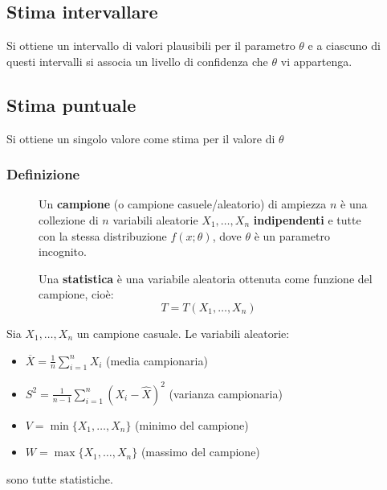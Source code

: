 \documentclass[a4paper]{article}
\theoremstyle{break}
\theoremstyle{break}
\theoremstyle{break}
\theoremstyle{break}
\begin{document}
\subsection{Stima intervallare}
Si ottiene un intervallo di valori plausibili per il parametro \( \theta \) e a
ciascuno di questi intervalli si associa un livello di confidenza che \( \theta \) vi
appartenga.

\subsection{Stima puntuale}
Si ottiene un singolo valore come stima per il valore di \( \theta \)

\subsubsection{Definizione}
\begin{figure}[H]
  \begin{definition}
    Un \textbf{campione} (o campione casuele/aleatorio) di ampiezza \( n \) è una
    collezione di \( n \) variabili aleatorie \( X_1, \ldots, X_n \) \textbf{indipendenti}
    e tutte con la stessa distribuzione \( f(x; \theta) \), dove \( \theta \) è un
    parametro incognito.
    
    \vspace{1em}
    \noindent Una \textbf{statistica} è una variabile aleatoria ottenuta come funzione
    del campione, cioè:
    \[
    T = T(X_1, \ldots, X_n)
    \] 
  \end{definition}
\end{figure}

\begin{example}
  Sia \( X_1, \ldots, X_n \) un campione casuale. Le variabili aleatorie:
  \begin{itemize}
    \item \( \overline{X} = \frac{1}{n} \sum_{i=1}^n X_i \) (media campionaria)

    \item \( S^2 = \frac{1}{n-1} \sum_{i=1}^n (X_i - \hat{X})^2 \) (varianza campionaria)

    \item \( V = \min\{X_1, \ldots, X_n\} \) (minimo del campione)

    \item \( W = \max\{X_1, \ldots, X_n\} \) (massimo del campione)
  \end{itemize}
  sono tutte statistiche.
\end{example}
\end{document}
